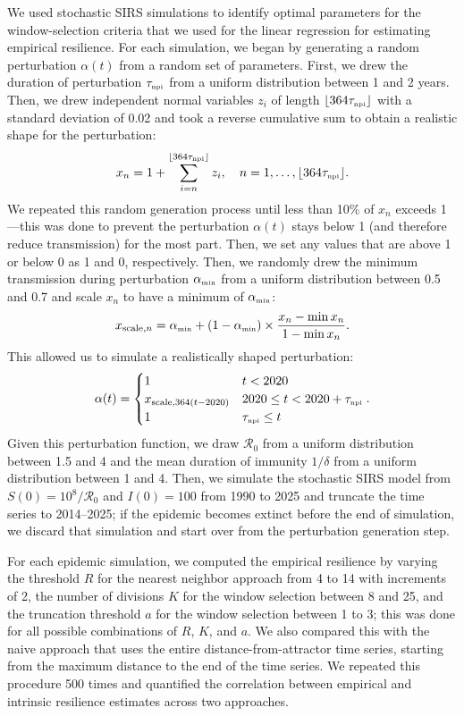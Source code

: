 \documentclass[12pt]{article}
\newcommand{\tsub}[2]{#1_{{\textrm{\tiny #2}}}}
\begin{document}
We used stochastic SIRS simulations to identify optimal parameters for the window-selection criteria that we used for the linear regression for estimating empirical resilience.
For each simulation, we began by generating a random perturbation $\alpha(t)$ from a random set of parameters.
First, we drew the duration of perturbation $\tsub{\tau}{npi}$ from a uniform distribution between 1 and 2 years.
Then, we drew independent normal variables $z_i$ of length $\lfloor 364 \tsub{\tau}{npi} \rfloor$ with a standard deviation of 0.02 and took a reverse cumulative sum to obtain a realistic shape for the perturbation:
\begin{equation}
x_n = 1 + \sum_{i=n}^{\lfloor 364 \tsub{\tau}{npi}\rfloor} z_i, \quad n = 1, \dots, \lfloor 364 \tsub{\tau}{npi}\rfloor.
\end{equation}
We repeated this random generation process until less than 10\% of $x_n$ exceeds 1---this was done to prevent the perturbation $\alpha(t)$ stays below 1 (and therefore reduce transmission) for the most part.
Then, we set any values that are above 1 or below 0 as 1 and 0, respectively.
Then, we randomly drew the minimum transmission during perturbation $\tsub{\alpha}{min}$ from a uniform distribution between 0.5 and 0.7 and scale $x_n$ to have a minimum of $\tsub{\alpha}{min}$:
\begin{equation}
x_{\textrm{scale},n} =  \tsub{\alpha}{min} + (1- \tsub{\alpha}{min}) \times \frac{x_n-\min x_n}{1- \min x_n}.
\end{equation}
This allowed us to simulate a realistically shaped perturbation:
\begin{equation}
\alpha(t) = \begin{cases}
1 & t < 2020\\
x_{\textrm{scale},364(t-2020)} & 2020 \leq t < 2020 + \tsub{\tau}{npi}\\
1 & \tsub{\tau}{npi} \leq t
\end{cases}.
\end{equation}
Given this perturbation function, we draw $\mathcal R_0$ from a uniform distribution between 1.5 and 4 and the mean duration of immunity $1/\delta$ from a uniform distribution between 1 and 4.
Then, we simulate the stochastic SIRS model from $S(0) = 10^8/\mathcal R_0$ and $I(0) = 100$ from 1990 to 2025 and truncate the time series to 2014--2025;
if the epidemic becomes extinct before the end of simulation, we discard that simulation and start over from the perturbation generation step.

For each epidemic simulation, we computed the empirical resilience by varying the threshold $R$ for the nearest neighbor approach from 4 to 14 with increments of 2, the number of divisions $K$ for the window selection between 8 and 25, and the truncation threshold $a$ for the window selection between 1 to 3;
this was done for all possible combinations of $R$, $K$, and $a$.
We also compared this with the naive approach that uses the entire distance-from-attractor time series, starting from the maximum distance to the end of the time series.
We repeated this procedure 500 times and quantified the correlation between empirical and intrinsic resilience estimates across two approaches.
\end{document}
